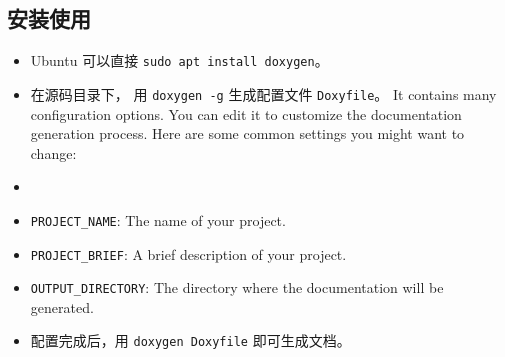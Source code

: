 \subsection{安装使用}
\begin{itemize}
\item Ubuntu 可以直接 \verb`sudo apt install doxygen`。
\item 在源码目录下， 用 \verb`doxygen -g` 生成配置文件 \verb`Doxyfile`。 It contains many configuration options. You can edit it to customize the documentation generation process. Here are some common settings you might want to change:\item 
\item \verb`PROJECT_NAME`: The name of your project.
\item \verb`PROJECT_BRIEF`: A brief description of your project.
\item \verb`OUTPUT_DIRECTORY`: The directory where the documentation will be generated.
\item 配置完成后，用 \verb`doxygen Doxyfile` 即可生成文档。
\end{itemize}
